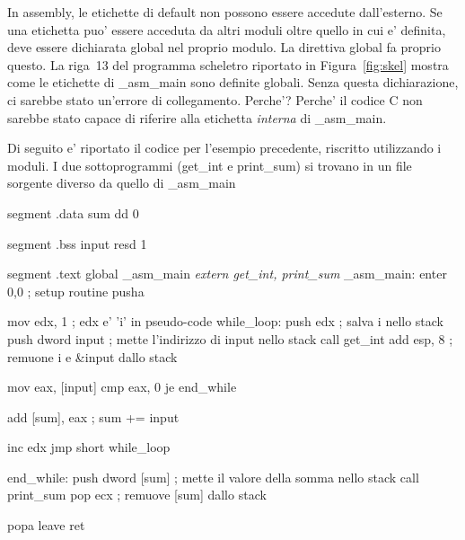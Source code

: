 In assembly, le etichette di default non possono essere accedute 
dall'esterno. Se una etichetta puo' essere acceduta da altri moduli
oltre quello in cui e' definita, deve essere dichiarata {\code global}
nel proprio modulo. La direttiva {\code global}
fa proprio questo. La riga~13 del programma scheletro riportato in 
Figura~\ref{fig:skel} mostra come le etichette di {\code \_asm\_main}
sono definite globali. Senza questa dichiarazione, ci sarebbe stato
un'errore di collegamento. Perche'? Perche' il codice C non sarebbe stato
capace di riferire alla etichetta \emph{interna} di {\code \_asm\_main}.

Di seguito e' riportato il codice per l'esempio precedente, riscritto 
utilizzando i moduli. I due sottoprogrammi ({\code get\_int} e {\code print\_sum})
si trovano in un file sorgente diverso da quello di {\code \_asm\_main}

\begin{AsmCodeListing}[label=main4.asm,commandchars=\\\{\}]

segment .data
sum     dd   0

segment .bss
input   resd 1

segment .text
        global  _asm_main
\textit{        extern  get_int, print_sum}
_asm_main:
        enter   0,0               ; setup routine
        pusha

        mov     edx, 1            ; edx e' 'i' in pseudo-code
while_loop:
        push    edx               ; salva i nello stack
        push    dword input       ; mette l'indirizzo di input nello stack
        call    get_int
        add     esp, 8            ; remuone i e &input dallo stack

        mov     eax, [input]
        cmp     eax, 0
        je      end_while

        add     [sum], eax        ; sum += input

        inc     edx
        jmp     short while_loop

end_while:
        push    dword [sum]       ; mette il valore della somma nello stack
        call    print_sum
        pop     ecx               ; remuove [sum] dallo stack

        popa
        leave                     
        ret
\end{AsmCodeListing}

